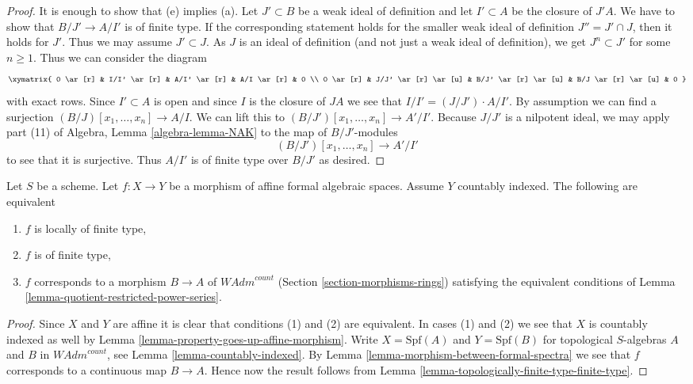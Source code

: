 \begin{proof}
It is enough to show that (e) implies (a). Let $J' \subset B$ be a weak ideal
of definition and let $I' \subset A$ be the closure of $J'A$. We have
to show that $B/J' \to A/I'$ is of finite type. If the corresponding statement
holds for the smaller weak ideal of definition $J'' = J' \cap J$, then it
holds for $J'$. Thus we may assume $J' \subset J$. As $J$ is an ideal
of definition (and not just a weak ideal of definition), we get
$J^n \subset J'$ for some $n \geq 1$. Thus we can consider the
diagram
$$
\xymatrix{
0 \ar[r] & I/I' \ar[r] & A/I' \ar[r] & A/I \ar[r] & 0 \\
0 \ar[r] & J/J' \ar[r] \ar[u] & B/J' \ar[r] \ar[u] & B/J \ar[r] \ar[u] & 0
}
$$
with exact rows. Since $I' \subset A$ is open and since
$I$ is the closure of $J A$ we see that $I/I' = (J/J') \cdot A/I'$.
By assumption we can find a surjection $(B/J)[x_1, \ldots, x_n] \to A/I$.
We can lift this to $(B/J')[x_1, \ldots, x_n] \to A'/I'$.
Because $J/J'$ is a nilpotent ideal, we may apply part (11) of
Algebra, Lemma \ref{algebra-lemma-NAK} to the map of $B/J'$-modules
$$
(B/J')[x_1, \ldots, x_n] \to A'/I'
$$
to see that it is surjective. Thus $A/I'$ is of finite type over $B/J'$
as desired.
\end{proof}

\begin{lemma}
\label{lemma-representable-affine-finite-type}
Let $S$ be a scheme. Let $f : X \to Y$ be a morphism of
affine formal algebraic spaces. Assume $Y$ countably indexed.
The following are equivalent
\begin{enumerate}
\item $f$ is locally of finite type,
\item $f$ is of finite type,
\item $f$ corresponds to a morphism $B \to A$ of $\textit{WAdm}^{count}$
(Section \ref{section-morphisms-rings})
satisfying the equivalent conditions of
Lemma \ref{lemma-quotient-restricted-power-series}.
\end{enumerate}
\end{lemma}

\begin{proof}
Since $X$ and $Y$ are affine it is clear that conditions (1)
and (2) are equivalent. In cases (1) and (2) we see that
$X$ is countably indexed as well by
Lemma \ref{lemma-property-goes-up-affine-morphism}.
Write $X = \text{Spf}(A)$ and $Y = \text{Spf}(B)$
for topological $S$-algebras $A$ and $B$ in $\textit{WAdm}^{count}$, see
Lemma \ref{lemma-countably-indexed}. By
Lemma \ref{lemma-morphism-between-formal-spectra}
we see that $f$ corresponds to a continuous map $B \to A$.
Hence now the result follows from
Lemma \ref{lemma-topologically-finite-type-finite-type}.
\end{proof}

